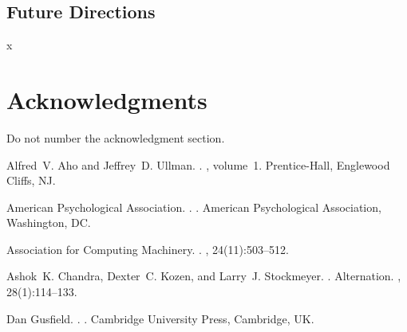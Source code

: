 \documentclass[11pt,letterpaper]{article}
\begin{document}
\subsection{Future Directions}

x

\section*{Acknowledgments}

Do not number the acknowledgment section.

\begin{thebibliography}{}

Alfred~V. Aho and Jeffrey~D. Ullman.
.
, volume~1.
\newblock Prentice-{Hall}, Englewood Cliffs, NJ.

{American Psychological Association}.
.
.
\newblock American Psychological Association, Washington, DC.

{Association for Computing Machinery}.
.
, 24(11):503--512.

Ashok~K. Chandra, Dexter~C. Kozen, and Larry~J. Stockmeyer.
.
\newblock Alternation.
,
  28(1):114--133.

Dan Gusfield.
.
.
\newblock Cambridge University Press, Cambridge, UK.

\end{thebibliography}
\end{document}
